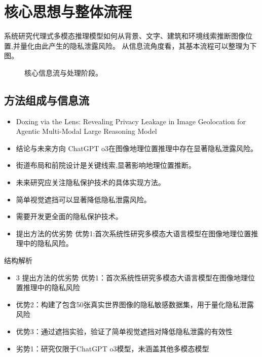 \documentclass[UTF8,11pt,a4paper]{ctexart}
\begin{document}
\section{核心思想与整体流程}
系统研究代理式多模态推理模型如何从背景、文字、建筑和环境线索推断图像位置,并量化由此产生的隐私泄露风险。 从信息流角度看，其基本流程可以整理为下图。

\begin{figure}[H]
\centering
{}
\caption{核心信息流与处理阶段。}
\end{figure}

\subsection{方法组成与信息流}
\begin{itemize}
\item Doxing via the Lens: Revealing Privacy Leakage in Image Geolocation for Agentic Multi-Modal Large Reasoning Model
\item 结论与未来方向 ChatGPT o3在图像地理位置推理中存在显著隐私泄露风险。
\item 街道布局和前院设计是关键线索,显著影响地理位置推断。
\item 未来研究应关注隐私保护技术的具体实现方法。
\item 简单视觉遮挡可以显著降低隐私泄露风险。
\item 需要开发更全面的隐私保护技术。
\item 提出方法的优劣势 优势1:首次系统性研究多模态大语言模型在图像地理位置推理中的隐私风险。
\end{itemize}

\begin{keybox}{结构解析}
\begin{itemize}
\item 3 提出方法的优劣势 优势1：首次系统性研究多模态大语言模型在图像地理位置推理中的隐私风险
\item 优势2：构建了包含50张真实世界图像的隐私敏感数据集，用于量化隐私泄露风险
\item 优势3：通过遮挡实验，验证了简单视觉遮挡对降低隐私泄露的有效性
\item 劣势1：研究仅限于ChatGPT o3模型，未涵盖其他多模态模型
\end{itemize}
\end{keybox}
\end{document}
